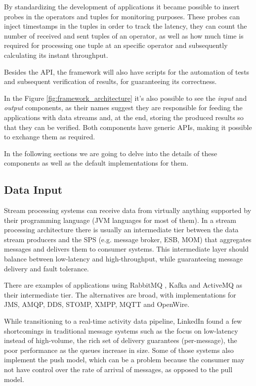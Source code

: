 \documentclass[ppgc,diss,english]{iiufrgs}
\begin{document}
By standardizing the development of applications it became possible to insert probes in the operators and tuples for monitoring purposes. These probes can inject timestamps in the tuples in order to track the latency, they can count the number of received and sent tuples of an operator, as well as how much time is required for processing one tuple at an specific operator and subsequently calculating its instant throughput.

Besides the API, the framework will also have scripts for the automation of tests and subsequent verification of results, for guaranteeing its correctness.

In the Figure \ref{fig:framework_architecture} it's also possible to see the \textit{input} and \textit{output} components, as their names suggest they are responsible for feeding the applications with data streams and, at the end, storing the produced results so that they can be verified. Both components have generic APIs, making it possible to exchange them as required.

In the following sections we are going to delve into the details of these components as well as the default implementations for them.

\subsection{Data Input}

Stream processing systems can receive data from virtually anything supported by their programming language (JVM languages for most of them). In a stream processing architecture there is usually \cite{chardonnens2013big, lim2013execution, wang2013cluster, sawant2013big} an intermediate tier between the data stream producers and the SPS (e.g. message broker, ESB, MOM) that aggregates messages and delivers them to consumer systems. This intermediate layer should balance between low-latency and high-throughput, while guaranteeing message delivery and fault tolerance.

There are examples of applications using RabbitMQ \cite{yang2013big, bumgardner2014scalable}, Kafka \cite{chardonnens2013big, lim2013execution, wang2013cluster} and ActiveMQ \cite{appel2012eventlets, krawczyk2011basic} as their intermediate tier. The alternatives are broad, with implementations for JMS, AMQP, DDS, STOMP, XMPP, MQTT and OpenWire.

While transitioning to a real-time activity data pipeline, LinkedIn \cite{goodhope2012building} found a few shortcomings in traditional message systems such as the focus on low-latency instead of high-volume, the rich set of delivery guarantees (per-message), the poor performance as the queues increase in size. Some of those systems also implement the push model, which can be a problem because the consumer may not have control over the rate of arrival of messages, as opposed to the pull model.
\end{document}
